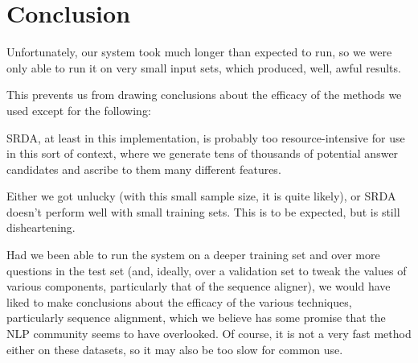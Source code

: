 \documentclass{article}
\begin{document}
\section{Conclusion}

Unfortunately, our system took much longer than expected to run, so we were
only able to run it on very small input sets, which produced, well, awful
results.

This prevents us from drawing conclusions about the efficacy of the methods we
used except for the following:

SRDA, at least in this implementation, is probably too resource-intensive for
use in this sort of context, where we generate tens of thousands of potential
answer candidates and ascribe to them many different features.

Either we got unlucky (with this small sample size, it is quite likely), or
SRDA doesn't perform well with small training sets.  This is to be expected,
but is still disheartening.

Had we been able to run the system on a deeper training set and over more
questions in the test set (and, ideally, over a validation set to tweak the
values of various components, particularly that of the sequence aligner), we
would have liked to make conclusions about the efficacy of the various
techniques, particularly sequence alignment, which we believe has some promise
that the NLP community seems to have overlooked.  Of course, it is not a very
fast method either on these datasets, so it may also be too slow for common use.
\end{document}
